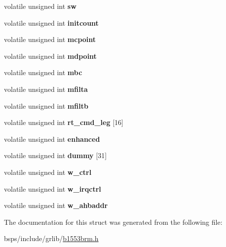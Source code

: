 \begin{DoxyCompactItemize}
volatile unsigned int {\bfseries sw}
\item 
\mbox{\label{structbrm__reg_a309198378f5e0e5eefd4d0de6b8821ed}} 
volatile unsigned int {\bfseries initcount}
\item 
\mbox{\label{structbrm__reg_ab06e0a605de0218cd5a03370d9f4aac3}} 
volatile unsigned int {\bfseries mcpoint}
\item 
\mbox{\label{structbrm__reg_acd7dda0574fee53a12821f50d6b3d668}} 
volatile unsigned int {\bfseries mdpoint}
\item 
\mbox{\label{structbrm__reg_a7b3bebb58d85e8eba291f8608558b05b}} 
volatile unsigned int {\bfseries mbc}
\item 
\mbox{\label{structbrm__reg_a5827169558b502d78b20300a4e26b0ff}} 
volatile unsigned int {\bfseries mfilta}
\item 
\mbox{\label{structbrm__reg_a30e21362cd202e9d0ea87fba60496611}} 
volatile unsigned int {\bfseries mfiltb}
\item 
\mbox{\label{structbrm__reg_abb0853aa65ca9de379e7816b71051846}} 
volatile unsigned int {\bfseries rt\+\_\+cmd\+\_\+leg} \mbox{[}16\mbox{]}
\item 
\mbox{\label{structbrm__reg_a5f2cfc00759fbb2147fdb076fc069885}} 
volatile unsigned int {\bfseries enhanced}
\item 
\mbox{\label{structbrm__reg_adaa00f0f4b3c21ce131d8989bf6ef220}} 
volatile unsigned int {\bfseries dummy} \mbox{[}31\mbox{]}
\item 
\mbox{\label{structbrm__reg_a03dd79c635c93ba7f30b422093c6afd4}} 
volatile unsigned int {\bfseries w\+\_\+ctrl}
\item 
\mbox{\label{structbrm__reg_a227829021dbd05695ffc2dd84cccc125}} 
volatile unsigned int {\bfseries w\+\_\+irqctrl}
\item 
\mbox{\label{structbrm__reg_a36f7498032be43116a34453fa7656064}} 
volatile unsigned int {\bfseries w\+\_\+ahbaddr}
\end{DoxyCompactItemize}


The documentation for this struct was generated from the following file\+:\begin{DoxyCompactItemize}
\item 
bsps/include/grlib/\mbox{\hyperlink{b1553brm_8h}{b1553brm.\+h}}\end{DoxyCompactItemize}
